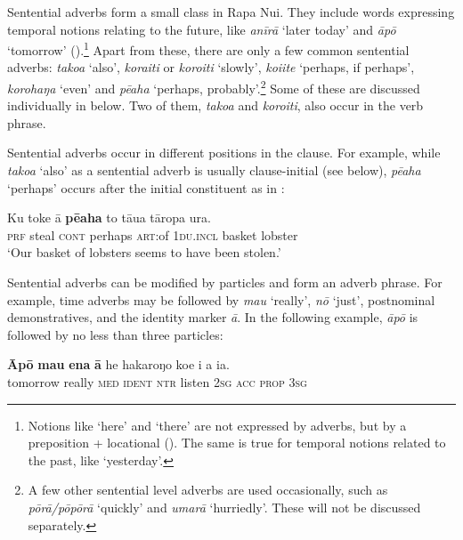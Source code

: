 Sentential adverbs form a small class in Rapa Nui. They include words expressing temporal notions relating to the future, like \textit{{\ꞌ}anīrā} ‘later today’ and \textit{āpō} ‘tomorrow’ ().\footnote{\label{fn:192}Notions like ‘here’ and ‘there’ are not expressed by adverbs, but by a preposition + locational (). The same is true for temporal notions related to the past, like ‘yesterday’.} Apart from these, there are only a few common sentential adverbs: \textit{tako{\ꞌ}a} ‘also’, \textit{\mbox{kora{\ꞌ}iti}} or \textit{\mbox{koro{\ꞌ}iti}} ‘slowly’, \textit{koi{\ꞌ}ite} ‘perhaps, if perhaps’, \textit{korohaŋa} ‘even’ and \textit{pēaha} ‘perhaps, probably’.\footnote{\label{fn:193}A few other sentential level adverbs are used occasionally, such as \textit{pōrā/pōpōrā} ‘quickly’ and \textit{umarā} ‘hurriedly’. These will not be discussed separately.} Some of these are discussed individually in  below. Two of them, \textit{\mbox{tako{\ꞌ}a}} and \textit{\mbox{koro{\ꞌ}iti}}, also occur in the verb phrase.

Sentential adverbs occur in different positions in the clause. For example, while \textit{tako{\ꞌ}a} ‘also’ as a sentential adverb is usually clause-initial (see  below), \textit{pēaha} ‘perhaps’ occurs after the initial constituent as in :

\ea\label{ex:4.127}
\gll Ku toke {\ꞌ}ā \textbf{pēaha} to tāua tāropa {\ꞌ}ura. \\
\textsc{prf} steal \textsc{cont} perhaps \textsc{art}:of \textsc{1du.incl} basket lobster \\

\glt
‘Our basket of lobsters seems to have been stolen.’ \textstyleExampleref{[Mtx-7-28.050]}
\z

Sentential adverbs can be modified by particles and form an adverb phrase. For example, time adverbs may be followed by \textit{mau} ‘really’, \textit{nō} ‘just’, postnominal demonstratives, and the identity marker \textit{{\ꞌ}ā}. In the following example, \textit{āpō} is followed by no less than three particles:

\ea\label{ex:4.128}
\gll \textbf{Āpō} \textbf{mau} \textbf{ena} \textbf{{\ꞌ}ā} he hakaroŋo koe i a ia.\\
tomorrow really \textsc{med} \textsc{ident} \textsc{ntr} listen \textsc{2sg} \textsc{acc} \textsc{prop} \textsc{3sg}\\

